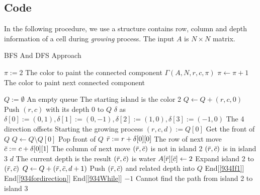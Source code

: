 \subsection{Code}
In the following procedure, we use a structure contains row, column and depth information of a cell during \textit{growing} process. The input $A$ is $N\times N$ matrix.
\setcounter{algorithm}{0}
\begin{algorithm}[H]
\caption{BFS And DFS Approach}
\begin{algorithmic}[1]
\State $\pi:=2$ \Comment The color to paint the connected component
\State $\Gamma(A, N, r, c, \pi)$
\State $\pi \gets \pi+1$ \Comment The color to paint next connected component
\EndIf
\EndFor
\EndFor
{}
\end{algorithmic}
\end{algorithm}
\begin{algorithm}[H]
\begin{algorithmic}[1]
\State $Q:=\emptyset$ \Comment An empty queue
 \Comment The starting island is the color 2
\State $Q \gets Q + (r, c, 0)$ \Comment Push $(r,c)$ with its depth 0 to $Q$
\EndIf
\EndFor
\EndFor
\State $\delta$ as $\delta[0]:=(0,1), \delta[1]:=(0,-1), \delta[2]:=(1,0), \delta[3]:=(-1,0)$ \Comment The 4 direction offsets
 \Comment Starting the growing process \label{934While}
\State $(r, c, d) := Q[0]$ \Comment Get the front of $Q$
\State $Q\gets Q\setminus Q[0]$  \Comment Pop front of $Q$
 \label{934fordirection}
\State $\Bar{r}:=r + \delta[0][0]$ \Comment The row of next move
\State $\Bar{c}:=c + \delta[0][1]$ \Comment The column of next move
 \Comment $(\Bar{r}, \Bar{c})$ is not in island 2 \label{934If1}
 \Comment $(\Bar{r}, \Bar{c})$ is in island 3
\State \Return $d$ \Comment The current depth is the result
\EndIf
{} \Comment $(\Bar{r}, \Bar{c})$ is water
\State $A[\Bar{r}][\Bar{c}]\gets 2$ \Comment Expand island 2 to $(\Bar{r}, \Bar{c})$
\State $Q\gets Q + (\Bar{r},\Bar{c},d+1)$ \Comment Push $(\Bar{r}, \Bar{c})$ and related depth into $Q$
\EndIf 
\EndIf \Comment End[\ref{934If1}]
\EndFor \Comment End[\ref{934fordirection}] 
\EndWhile \Comment End[\ref{934While}]
\State \Return $-1$ \Comment Cannot find the path from island 2 to island 3
\EndProcedure
\end{algorithmic}
\end{algorithm}
